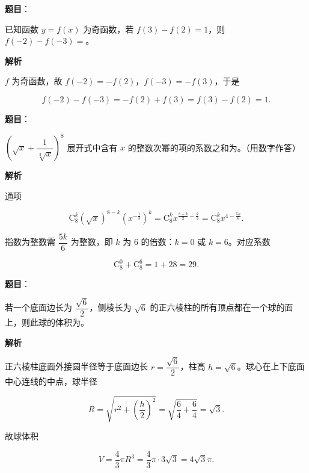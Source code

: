 \begin{answer}

\textbf{题目}：

已知函数 $y=f(x)$ 为奇函数，若 $f(3)-f(2)=1$，则 $f(-2)-f(-3)=$\gkblank{}。

\textbf{解析}

$f$ 为奇函数，故 $f(-2)=-f(2)$，$f(-3)=-f(3)$，于是

\nopagebreak[4]
\[f(-2)-f(-3)=-f(2)+f(3)=f(3)-f(2)=1.\]


\end{answer}
\begin{answer}

\textbf{题目}：

$\left(\sqrt x+\dfrac1{\sqrt[3]x}\right)^8$ 展开式中含有 $x$ 的整数次幂的项的系数之和为\gkblank{}。（用数字作答）

\textbf{解析}

通项

\nopagebreak[4]
\[\mathrm C_8^k(\sqrt x)^{8-k}\left(x^{-\frac13}\right)^k=\mathrm C_8^k x^{\frac{8-k}2-\frac k3}=\mathrm C_8^k x^{4-\frac{5k}6}.\]

指数为整数需 $\dfrac{5k}6$ 为整数，即 $k$ 为 $6$ 的倍数：$k=0$ 或 $k=6$。对应系数

\nopagebreak[4]
\[\mathrm C_8^0+\mathrm C_8^6=1+28=29.\]


\end{answer}
\begin{answer}

\textbf{题目}：

若一个底面边长为 $\dfrac{\sqrt6}{2}$，侧棱长为 $\sqrt6$ 的正六棱柱的所有顶点都在一个球的面上，则此球的体积为\gkblank{}。

\textbf{解析}

正六棱柱底面外接圆半径等于底面边长 $r=\dfrac{\sqrt6}2$，柱高 $h=\sqrt6$。球心在上下底面中心连线的中点，球半径

\nopagebreak[4]
\[R=\sqrt{r^2+\left(\frac h2\right)^2}=\sqrt{\frac64+\frac64}=\sqrt3.\]

故球体积

\nopagebreak[4]
\[V=\frac43\pi R^3=\frac43\pi\cdot3\sqrt3=4\sqrt3\pi.\]


\end{answer}
